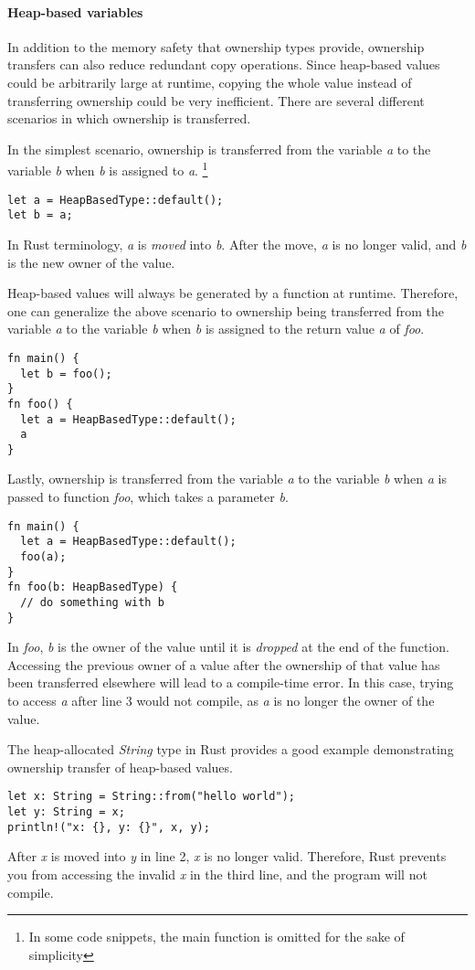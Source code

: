 \documentclass[sigplan,11pt,nonacm]{acmart}
\begin{document}
\paragraph{Heap-based variables}

In addition to the memory safety that ownership types provide, ownership transfers can also reduce redundant copy operations.
Since heap-based values could be arbitrarily large at runtime, copying the whole value instead of transferring ownership could be very inefficient.
There are several different scenarios in which ownership is transferred.

In the simplest scenario, ownership is transferred from the variable \emph{a} to the variable \emph{b} when \emph{b} is assigned to \emph{a}.
\footnote{In some code snippets, the main function is omitted for the sake of simplicity}

\begin{lstlisting}
let a = HeapBasedType::default();
let b = a;
\end{lstlisting}
In Rust terminology, \emph{a} is \emph{moved} into \emph{b}.
After the move, \emph{a} is no longer valid, and \emph{b} is the new owner of the value.

Heap-based values will always be generated by a function at runtime.
Therefore, one can generalize the above scenario to ownership being transferred from the variable \emph{a} to the variable \emph{b} when \emph{b} is assigned to the return value \emph{a} of \emph{foo}.
\begin{lstlisting}
fn main() {
  let b = foo();
}
fn foo() {
  let a = HeapBasedType::default();
  a
}
\end{lstlisting}

Lastly, ownership is transferred from the variable \emph{a} to the variable \emph{b} when \emph{a} is passed to function \emph{foo}, which takes a parameter \emph{b}.
\begin{lstlisting}
fn main() {
  let a = HeapBasedType::default();
  foo(a);
}
fn foo(b: HeapBasedType) {
  // do something with b
}
\end{lstlisting}
In \emph{foo}, \emph{b} is the owner of the value until it is \emph{dropped} at the end of the function.
Accessing the previous owner of a value after the ownership of that value has been transferred elsewhere will lead to a compile-time error.
In this case, trying to access \emph{a} after line 3 would not compile, as \emph{a} is no longer the owner of the value.

The heap-allocated \emph{String} type in Rust provides a good example demonstrating ownership transfer of heap-based values.
\begin{lstlisting}
let x: String = String::from("hello world");
let y: String = x;
println!("x: {}, y: {}", x, y);
\end{lstlisting}
After \emph{x} is moved into \emph{y} in line 2, \emph{x} is no longer valid.
Therefore, Rust prevents you from accessing the invalid \emph{x} in the third line, and the program will not compile.
\end{document}
